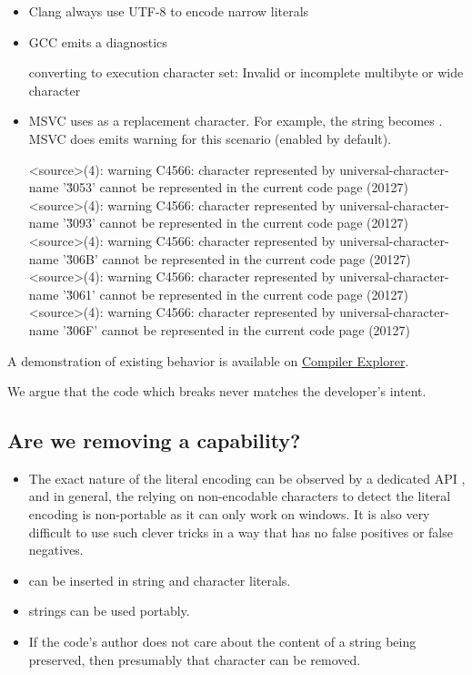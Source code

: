\documentclass{wg21}
\begin{document}
\begin{itemize}
\item Clang always use UTF-8 to encode narrow literals
\item GCC emits a diagnostics

\begin{quoteblock}
    converting to execution character set: Invalid or incomplete multibyte or wide character
\end{quoteblock}
\item MSVC uses  as a replacement character.
For example, the string  becomes .
MSVC does emits warning for this scenario (enabled by default).

\begin{quoteblock}
    \begin{codeblock}
        <source>(4): warning C4566: character represented by universal-character-name
        '\u3053' cannot be represented in the current code page (20127)
        <source>(4): warning C4566: character represented by universal-character-name
        '\u3093' cannot be represented in the current code page (20127)
        <source>(4): warning C4566: character represented by universal-character-name
        '\u306B' cannot be represented in the current code page (20127)
        <source>(4): warning C4566: character represented by universal-character-name
        '\u3061' cannot be represented in the current code page (20127)
        <source>(4): warning C4566: character represented by universal-character-name
        '\u306F' cannot be represented in the current code page (20127)
    \end{codeblock}
\end{quoteblock}

\end{itemize}

A demonstration of existing behavior is available on \href{https://compiler-explorer.com/z/4vheqx1oj}{Compiler Explorer}.

We argue that the code which breaks never matches the developer's intent.

\subsection{Are we removing a capability?}

\begin{itemize}
\item The exact nature of the literal encoding can be observed by a dedicated API , and in general, the relying on non-encodable characters to detect the literal encoding
is non-portable as it can only work on windows. It is also very difficult to use such clever tricks in a way that has no false positives or false negatives.
\item {} can be inserted in string and character literals.
\item {} strings can be used portably.
\item If the code's author does not care about the content of a string being preserved, then presumably that character can be removed.
\end{itemize}
\end{document}
